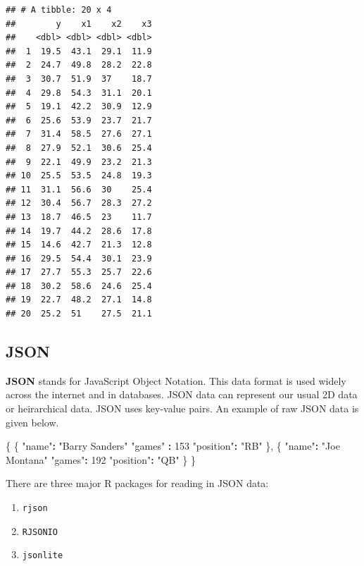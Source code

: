 \documentclass[
]{book}
\newenvironment{Shaded}{\begin{snugshade}}{\end{snugshade}}
\newcommand{\DecValTok}[1]{\textcolor[rgb]{0.00,0.00,0.81}{#1}}
\newcommand{\NormalTok}[1]{#1}
\newcommand{\OperatorTok}[1]{\textcolor[rgb]{0.81,0.36,0.00}{\textbf{#1}}}
\newcommand{\StringTok}[1]{\textcolor[rgb]{0.31,0.60,0.02}{#1}}
\theoremstyle{definition}
\theoremstyle{definition}
\theoremstyle{definition}
\theoremstyle{remark}
\begin{document}
\begin{verbatim}
## # A tibble: 20 x 4
##        y    x1    x2    x3
##    <dbl> <dbl> <dbl> <dbl>
##  1  19.5  43.1  29.1  11.9
##  2  24.7  49.8  28.2  22.8
##  3  30.7  51.9  37    18.7
##  4  29.8  54.3  31.1  20.1
##  5  19.1  42.2  30.9  12.9
##  6  25.6  53.9  23.7  21.7
##  7  31.4  58.5  27.6  27.1
##  8  27.9  52.1  30.6  25.4
##  9  22.1  49.9  23.2  21.3
## 10  25.5  53.5  24.8  19.3
## 11  31.1  56.6  30    25.4
## 12  30.4  56.7  28.3  27.2
## 13  18.7  46.5  23    11.7
## 14  19.7  44.2  28.6  17.8
## 15  14.6  42.7  21.3  12.8
## 16  29.5  54.4  30.1  23.9
## 17  27.7  55.3  25.7  22.6
## 18  30.2  58.6  24.6  25.4
## 19  22.7  48.2  27.1  14.8
## 20  25.2  51    27.5  21.1
\end{verbatim}

\hypertarget{json-1}{%
\subsection{JSON}\label{json-1}}

\textbf{JSON} stands for JavaScript Object Notation. This data format is used widely across the internet and in databases. JSON data can represent our usual 2D data or heirarchical data. JSON uses key-value pairs. An example of raw JSON data is given below.

\begin{Shaded}
\begin{Highlighting}[]
\NormalTok{\{  }
\NormalTok{  \{  }
    \StringTok{"name"}\OperatorTok{:}\StringTok{ "Barry Sanders"}  
    \StringTok{"games"} \OperatorTok{:}\StringTok{ }\DecValTok{153}  
    \StringTok{"position"}\OperatorTok{:}\StringTok{ "RB"}  
\NormalTok{  \},  }
\NormalTok{  \{  }
    \StringTok{"name"}\OperatorTok{:}\StringTok{ "Joe Montana"}  
    \StringTok{"games"}\OperatorTok{:}\StringTok{ }\DecValTok{192}  
    \StringTok{"position"}\OperatorTok{:}\StringTok{ "QB"}  
\NormalTok{  \}  }
\NormalTok{\} }
\end{Highlighting}
\end{Shaded}

There are three major R packages for reading in JSON data:

\begin{enumerate}
\def\labelenumi{\arabic{enumi}.}
\item
  \texttt{rjson}
\item
  \texttt{RJSONIO}
\item
  \texttt{jsonlite}
\end{enumerate}
\end{document}
